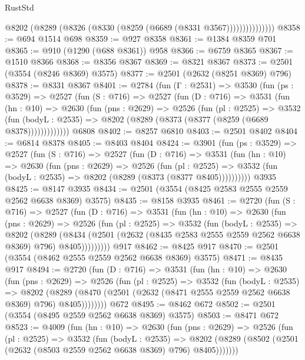 \begin{lexlean}{RustStd}
\begin{coremodule}
                    @8202 (@8289 (@8326 (@8330 (@8259 (@6689 (@8331 @3567)))))))))))))))
@8358 := @694 @1514 @698
@8359 := @927 @8358
@8361 := @1384 @8359 @701
@8365 := @910 (@1290 (@688 @8361)) @958
@8366 := @6759 @8365
@8367 := @1510 @8366
@8368 := @8356 @8367
@8369 := @8321 @8367
@8373 := @2501 (@3554 (@8246 @8369) @3575)
@8377 := @2501 (@2632 (@8251 @8369) @796)
@8378 := @8331 @8367
@8401 := @2784
    (fun (Γ : @2531) =>
    @3530
      (fun (ps : @3529) =>
      @2527
        (fun (S : @716) =>
        @2527
          (fun (D : @716) =>
          @3531
            (fun (hn : @10) =>
            @2630
              (fun (pns : @2629) =>
              @2526
                (fun (pl : @2525) =>
                @3532
                  (fun (bodyL : @2535) =>
                  @8202 (@8289 (@8373 (@8377 (@8259 (@6689 @8378)))))))))))))
    @6808
@8402 := @8257 @6810
@8403 := @2501 @8402
@8404 := @6814 @8378
@8405 := @8403 @8404
@8424 := @3901
    (fun (ps : @3529) =>
    @2527
      (fun (S : @716) =>
      @2527
        (fun (D : @716) =>
        @3531
          (fun (hn : @10) =>
          @2630
            (fun (pns : @2629) =>
            @2526
              (fun (pl : @2525) =>
              @3532 (fun (bodyL : @2535) => @8202 (@8289 (@8373 (@8377 @8405))))))))))
    @3935
@8425 := @8147 @3935
@8434 := @2501 (@3554 (@8425 @2583 @2555 @2559 @2562 @6638 @8369) @3575)
@8435 := @8158 @3935
@8461 := @2720
    (fun (S : @716) =>
    @2527
      (fun (D : @716) =>
      @3531
        (fun (hn : @10) =>
        @2630
          (fun (pns : @2629) =>
          @2526
            (fun (pl : @2525) =>
            @3532
              (fun (bodyL : @2535) =>
              @8202
                (@8289
                  (@8434
                    (@2501 (@2632 (@8435 @2583 @2555 @2559 @2562 @6638 @8369) @796) @8405)))))))))
    @917
@8462 := @8425 @917
@8470 := @2501 (@3554 (@8462 @2555 @2559 @2562 @6638 @8369) @3575)
@8471 := @8435 @917
@8494 := @2720
    (fun (D : @716) =>
    @3531
      (fun (hn : @10) =>
      @2630
        (fun (pns : @2629) =>
        @2526
          (fun (pl : @2525) =>
          @3532
            (fun (bodyL : @2535) =>
            @8202
              (@8289 (@8470 (@2501 (@2632 (@8471 @2555 @2559 @2562 @6638 @8369) @796) @8405))))))))
    @672
@8495 := @8462 @672
@8502 := @2501 (@3554 (@8495 @2559 @2562 @6638 @8369) @3575)
@8503 := @8471 @672
@8523 := @4009
    (fun (hn : @10) =>
    @2630
      (fun (pns : @2629) =>
      @2526
        (fun (pl : @2525) =>
        @3532
          (fun (bodyL : @2535) =>
          @8202 (@8289 (@8502 (@2501 (@2632 (@8503 @2559 @2562 @6638 @8369) @796) @8405)))))))

\end{coremodule}
\end{lexlean}
